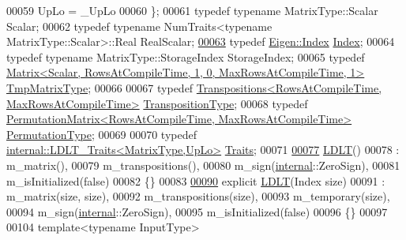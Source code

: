 \begin{DoxyCode}
00059       UpLo = \_UpLo
00060     \};
00061     \textcolor{keyword}{typedef} \textcolor{keyword}{typename} MatrixType::Scalar Scalar;
00062     \textcolor{keyword}{typedef} \textcolor{keyword}{typename} NumTraits<typename MatrixType::Scalar>::Real RealScalar;
\hyperlink{group___cholesky___module_ad9c57eb2fb3bbccd51b9d2e111bea355}{00063}     \textcolor{keyword}{typedef} \hyperlink{namespace_eigen_a62e77e0933482dafde8fe197d9a2cfde}{Eigen::Index} \hyperlink{group___cholesky___module_ad9c57eb2fb3bbccd51b9d2e111bea355}{Index}; 
00064     \textcolor{keyword}{typedef} \textcolor{keyword}{typename} MatrixType::StorageIndex StorageIndex;
00065     \textcolor{keyword}{typedef} \hyperlink{group___core___module}{Matrix<Scalar, RowsAtCompileTime, 1, 0, MaxRowsAtCompileTime, 1>}
       \hyperlink{group___core___module}{TmpMatrixType};
00066 
00067     \textcolor{keyword}{typedef} \hyperlink{group___core___module}{Transpositions<RowsAtCompileTime, MaxRowsAtCompileTime>}
       \hyperlink{group___core___module}{TranspositionType};
00068     \textcolor{keyword}{typedef} \hyperlink{group___core___module}{PermutationMatrix<RowsAtCompileTime, MaxRowsAtCompileTime>}
       \hyperlink{group___core___module}{PermutationType};
00069 
00070     \textcolor{keyword}{typedef} \hyperlink{struct_eigen_1_1internal_1_1_l_d_l_t___traits}{internal::LDLT\_Traits<MatrixType,UpLo>} 
      \hyperlink{struct_eigen_1_1internal_1_1_l_d_l_t___traits}{Traits};
00071 
\hyperlink{group___cholesky___module_a2e06dedd2651649c5b251fbf9ba4e7d4}{00077}     \hyperlink{group___cholesky___module_a2e06dedd2651649c5b251fbf9ba4e7d4}{LDLT}()
00078       : m\_matrix(),
00079         m\_transpositions(),
00080         m\_sign(\hyperlink{namespaceinternal}{internal}::ZeroSign),
00081         m\_isInitialized(false)
00082     \{\}
00083 
\hyperlink{group___cholesky___module_a154aa41bd2460199d48861eaf5e4f597}{00090}     \textcolor{keyword}{explicit} \hyperlink{group___cholesky___module_a154aa41bd2460199d48861eaf5e4f597}{LDLT}(Index size)
00091       : m\_matrix(size, size),
00092         m\_transpositions(size),
00093         m\_temporary(size),
00094         m\_sign(\hyperlink{namespaceinternal}{internal}::ZeroSign),
00095         m\_isInitialized(false)
00096     \{\}
00097 
00104     \textcolor{keyword}{template}<\textcolor{keyword}{typename} InputType>

\end{DoxyCode}
